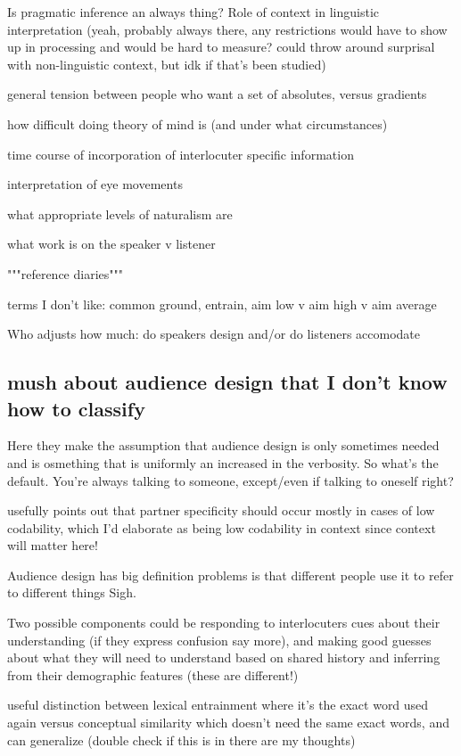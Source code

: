 \documentclass[]{article}
\begin{document}
Is pragmatic inference an always thing? Role of context in linguistic interpretation (yeah, probably always there, any restrictions would have to show up in processing and would be hard to measure? could throw around surprisal with non-linguistic context, but idk if that's been studied) 

general tension between people who want a set of absolutes, versus gradients

how difficult doing theory of mind is (and under what circumstances)

time course of incorporation of interlocuter specific information 

interpretation of eye movements

what appropriate levels of naturalism are

what work is on the speaker v listener

"""reference diaries"""

terms I don't like: common ground, entrain, aim low v aim high v aim average

Who adjusts how much: do speakers design and/or do listeners accomodate




\subsection{mush about audience design that I don't know how to classify}

\cite{horton2002a} Here they make the assumption that audience design is only sometimes needed and is osmething that is uniformly an increased in the verbosity. So what's the default. You're always talking to someone, except/even if talking to oneself right? 

\cite{horton2002a} usefully points out that partner specificity should occur mostly in cases of low codability, which I'd elaborate as being low codability in context since context will matter here!

Audience design has big definition problems is that different people use it to refer to different things Sigh. 

Two possible components could be  responding to interlocuters cues about their understanding (if they express confusion say more), and making good guesses about what they will need to understand based on shared history and inferring from their demographic features (these are different!) 

\cite{horton2002a} useful distinction between lexical entrainment where it's the exact word used again versus conceptual similarity which doesn't need the same exact words, and can generalize (double check if this is in there are my thoughts) 
\end{document}
